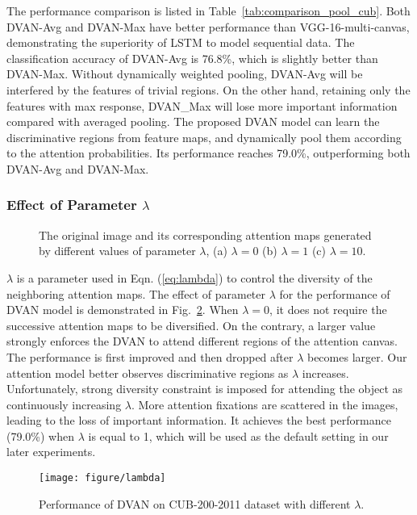 \documentclass[journal]{IEEEtran}
\begin{document}
The performance comparison is listed in Table~\ref{tab:comparison_pool_cub}. Both DVAN-Avg and DVAN-Max have better performance than VGG-16-multi-canvas, demonstrating the superiority of LSTM to model sequential data. The classification accuracy of DVAN-Avg is 76.8\%, which is slightly better than DVAN-Max. Without dynamically weighted pooling, DVAN-Avg will be interfered by the features of trivial regions. On the other hand, retaining only the features with max response, DVAN\_Max will lose more important information compared with averaged pooling. The proposed DVAN model can learn the discriminative regions from feature maps, and dynamically pool them according to the attention probabilities. Its performance reaches 79.0\%, outperforming both DVAN-Avg and DVAN-Max.

\subsubsection{Effect of Parameter $\lambda$}
\begin{figure}[!t]
\centering
{}
\vspace{-0.1in}
\hfil
{}
\vspace{-0.1in}
\hfil
{}
\hfil
\caption{The original image and its corresponding attention maps generated by different values of parameter $\lambda$, (a) $\lambda=0$ (b) $\lambda=1$ (c) $\lambda=10$.}
\label{fig:lambda}
\end{figure}

$\lambda$ is a parameter used in Eqn. (\ref{eq:lambda}) to control the diversity of the neighboring attention maps. The effect of parameter $\lambda$ for the performance of DVAN model is demonstrated in Fig.~\ref{fig:comparison_lambda}. When $\lambda = 0$, it does not require the successive attention maps to be diversified. On the contrary, a larger value strongly enforces the DVAN to attend different regions of the attention canvas. The performance is first improved and then dropped after $\lambda$ becomes larger. Our attention model better observes discriminative regions as $\lambda$ increases. Unfortunately, strong diversity constraint is imposed for attending the object as continuously increasing $\lambda$. More attention fixations are scattered in the images, leading to the loss of important information.
It achieves the best performance (79.0\%) when $\lambda$ is equal to 1, which will be used as the default setting in our later experiments.
\begin{figure}[t]
  \centering
  \texttt{[image: figure/lambda]}
  \vspace{-0.1in}
 \caption{Performance of DVAN on CUB-200-2011 dataset with different $\lambda$.}
  \label{fig:comparison_lambda}
    \vspace{-0.2in}
\end{figure}
\end{document}
